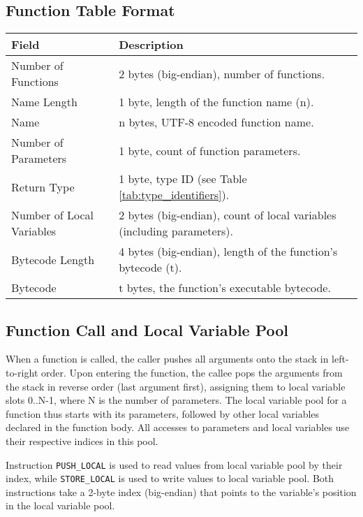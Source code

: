 \documentclass[a4paper,12pt]{article}
\begin{document}
    \subsection{Function Table Format}
    \begin{tabular}{|l|p{9cm}|}
        \hline
        \textbf{Field} & \textbf{Description} \\ \hline
        Number of Functions & 2 bytes (big-endian), number of functions. \\ \hline
        Name Length & 1 byte, length of the function name (n). \\ \hline
        Name & n bytes, UTF-8 encoded function name. \\ \hline
        Number of Parameters & 1 byte, count of function parameters. \\ \hline
        Return Type & 1 byte, type ID (see Table \ref{tab:type_identifiers}). \\ \hline
        Number of Local Variables & 2 bytes (big-endian), count of local variables (including parameters). \\ \hline
        Bytecode Length & 4 bytes (big-endian), length of the function's bytecode (t). \\ \hline
        Bytecode & t bytes, the function's executable bytecode. \\ \hline
    \end{tabular}
    \label{tab:function_table_format}

    \subsection{Function Call and Local Variable Pool}
    When a function is called, the caller pushes all arguments onto the stack in left-to-right order. Upon entering the function, the callee pops the arguments from the stack in reverse order (last argument first), assigning them to local variable slots 0..N-1, where N is the number of parameters. The local variable pool for a function thus starts with its parameters, followed by other local variables declared in the function body. All accesses to parameters and local variables use their respective indices in this pool.

    Instruction \texttt{PUSH\_LOCAL} is used to read values from local variable pool by their index, while \texttt{STORE\_LOCAL} is used to write values to local variable pool. Both instructions take a 2-byte index (big-endian) that points to the variable's position in the local variable pool.
\end{document}
